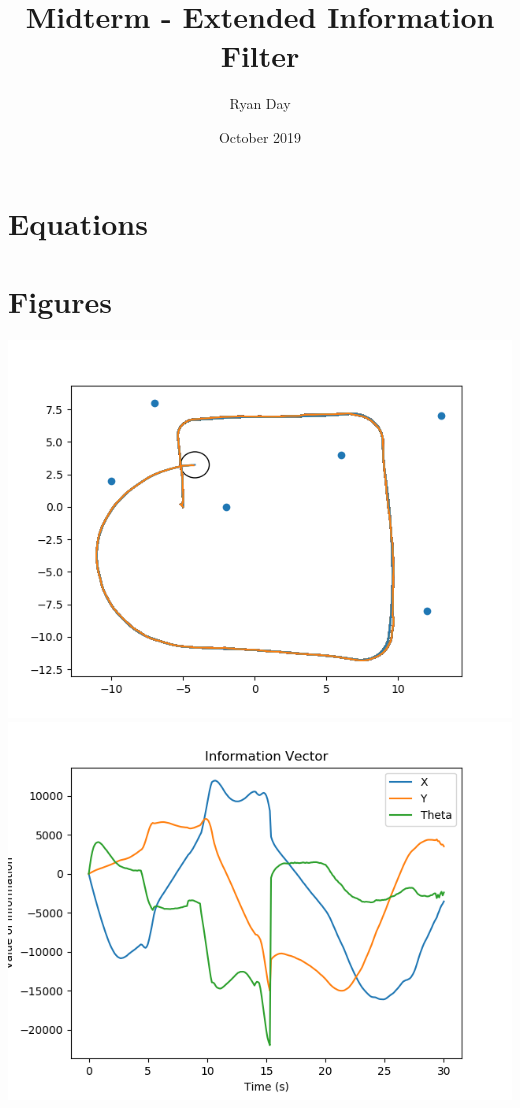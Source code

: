 \documentclass[a4paper]{article}
\title{Midterm - Extended Information Filter}
\author{Ryan Day}
\date{October 2019}
\begin{document}
\maketitle

\section{Equations}


\section{Figures}

\begin{center}
    \includegraphics[scale=0.7]{images/RobotPath.png}
    \includegraphics[scale=0.7]{images/InfoVector.png}

\end{center}
\end{document}

